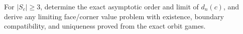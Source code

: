 For \(|S_c|\geq3\), determine the exact asymptotic order and limit of \(d_n(c)\), and derive any limiting face/corner value problem with existence, boundary compatibility, and uniqueness proved from the exact orbit games.